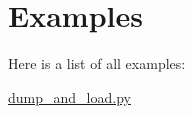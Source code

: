 \section{Examples}
Here is a list of all examples\+:\begin{DoxyCompactItemize}
\item 
\hyperlink{dump_and_load_8py-example}{dump\+\_\+and\+\_\+load.\+py}
\end{DoxyCompactItemize}
